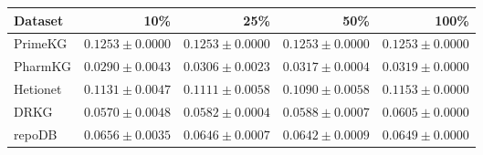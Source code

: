 \begin{tabular}{lrrrr}
\toprule
Dataset & 10\% & 25\% & 50\% & 100\% \\
\midrule
PrimeKG & $0.1253\pm0.0000$ & $0.1253\pm0.0000$ & $0.1253\pm0.0000$ & $0.1253\pm0.0000$ \\
PharmKG & $0.0290\pm0.0043$ & $0.0306\pm0.0023$ & $0.0317\pm0.0004$ & $0.0319\pm0.0000$ \\
Hetionet & $0.1131\pm0.0047$ & $0.1111\pm0.0058$ & $0.1090\pm0.0058$ & $0.1153\pm0.0000$ \\
DRKG & $0.0570\pm0.0048$ & $0.0582\pm0.0004$ & $0.0588\pm0.0007$ & $0.0605\pm0.0000$ \\
repoDB & $0.0656\pm0.0035$ & $0.0646\pm0.0007$ & $0.0642\pm0.0009$ & $0.0649\pm0.0000$ \\
\bottomrule
\end{tabular}
